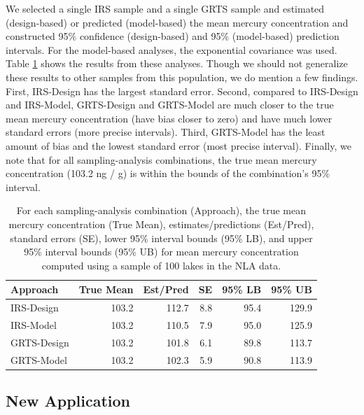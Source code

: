 \documentclass[]{elsarticle} %
\begin{document}
We selected a single IRS sample and a single GRTS sample and estimated
(design-based) or predicted (model-based) the mean mercury concentration
and constructed 95\% confidence (design-based) and 95\% (model-based)
prediction intervals. For the model-based analyses, the exponential
covariance was used. Table \ref{tab:appliedtab} shows the results from
these analyses. Though we should not generalize these results to other
samples from this population, we do mention a few findings. First,
IRS-Design has the largest standard error. Second, compared to
IRS-Design and IRS-Model, GRTS-Design and GRTS-Model are much closer to
the true mean mercury concentration (have bias closer to zero) and have
much lower standard errors (more precise intervals). Third, GRTS-Model
has the least amount of bias and the lowest standard error (most precise
interval). Finally, we note that for all sampling-analysis combinations,
the true mean mercury concentration (103.2 ng / g) is within the bounds
of the combination's 95\% interval.

\begin{table}[ht]
\centering
\begin{tabular}{lrrrrr}
  \hline
Approach & True Mean & Est/Pred & SE & 95\% LB & 95\% UB \\ 
  \hline
IRS-Design & 103.2 & 112.7 & 8.8 & 95.4 & 129.9 \\ 
  IRS-Model & 103.2 & 110.5 & 7.9 & 95.0 & 125.9 \\ 
  GRTS-Design & 103.2 & 101.8 & 6.1 & 89.8 & 113.7 \\ 
  GRTS-Model & 103.2 & 102.3 & 5.9 & 90.8 & 113.9 \\ 
   \hline
\end{tabular}
\caption{\label{tab:appliedtab} For each sampling-analysis combination (Approach), the true mean mercury concentration (True Mean), estimates/predictions (Est/Pred), standard errors (SE), lower 95\% interval bounds (95\% LB), and upper 95\% interval bounds (95\% UB) for mean mercury concentration computed using a sample of 100 lakes in the NLA data.} 
\end{table}

\hypertarget{new-application}{%
\subsection{New Application}\label{new-application}}
\end{document}

